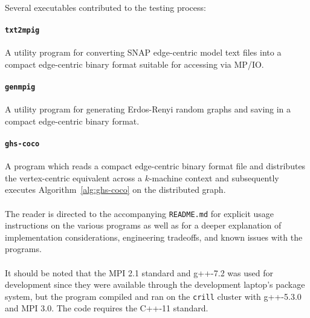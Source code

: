 \documentclass[11pt,epsf]{article}
\begin{document}
{{    \paragraph{}{
      Several executables contributed to the testing process:
    }
    \paragraph{\texttt{txt2mpig}}{
      A utility program for converting SNAP edge-centric model text files
      into a compact edge-centric binary format suitable for accessing via MP/IO.
    }
    \paragraph{\texttt{genmpig}}{
      A utility program for generating Erdos-Renyi random graphs and saving
      in a compact edge-centric binary format.
    }
    \paragraph{\texttt{ghs-coco}}{
      A program which reads a compact edge-centric binary format file and
      distributes the vertex-centric equivalent across a $k$-machine context
      and subsequently executes Algorithm~\ref{alg:ghs-coco} on the distributed graph.
    }
    \paragraph{}{
      The reader is directed to the accompanying \texttt{README.md} for
      explicit usage instructions on the various programs as well as
      for a deeper explanation of implementation considerations,
      engineering tradeoffs, and known issues with the programs.
    }
    \paragraph{}{
      It should be noted that the MPI 2.1 standard\autocite{MPI21} and g++-7.2
      was used for development since they were available through the development
      laptop's package system, but the program compiled and ran on the \texttt{crill}
      cluster with g++-5.3.0 and MPI 3.0. The code requires the C++-11 standard.
    }
}}
\end{document}
